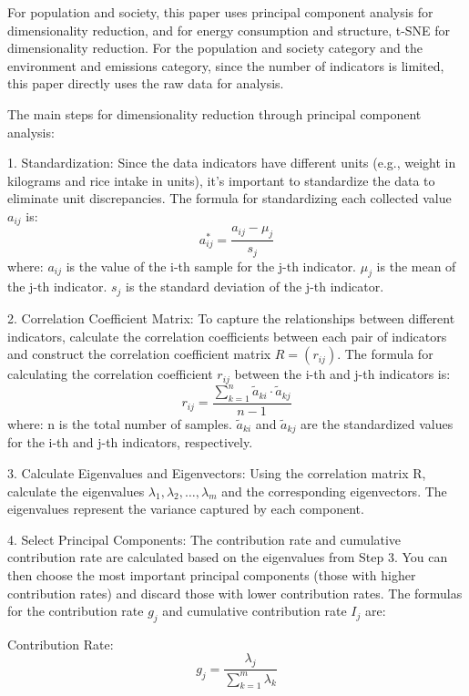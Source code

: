 \documentclass{article}
\begin{document}
	For population and society, this paper uses principal component analysis for dimensionality reduction, and for energy consumption and structure, t-SNE for dimensionality reduction. For the population and society category and the environment and emissions category, since the number of indicators is limited, this paper directly uses the raw data for analysis.
	
	The main steps for dimensionality reduction through principal component analysis:
	
	1. Standardization: Since the data indicators have different units (e.g., weight in kilograms and rice intake in units), it's important to standardize the data to eliminate unit discrepancies. The formula for standardizing each collected value $a_{ij}$ is:
	\begin{equation}
		a_{ij}^* = \frac{a_{ij} - \mu_j}{s_j}
	\end{equation}
	where: $a_{ij}$ is the value of the i-th sample for the j-th indicator. $\mu_{j}$ is the mean of the j-th indicator. $s_{j}$ is the standard deviation of the j-th indicator.
	
	2. Correlation Coefficient Matrix: To capture the relationships between different indicators, calculate the correlation coefficients between each pair of indicators and construct the correlation coefficient matrix $R=(r_{ij})$. The formula for calculating the correlation coefficient $r_{ij}$ between the i-th and j-th indicators is:
	\begin{equation}
		r_{ij}=\frac{\sum_{k=1}^{n}\tilde{a}_{ki}\cdot\tilde{a}_{kj}}{n-1}
	\end{equation}
	where: n is the total number of samples. $\tilde{a}_{ki}$ and $\tilde{a}_{kj}$ are the standardized values for the i-th and j-th indicators, respectively.
	
	3. Calculate Eigenvalues and Eigenvectors: Using the correlation matrix R, calculate the eigenvalues $\lambda_{1},\lambda_{2},\dots,\lambda_{m}$ and the corresponding eigenvectors. The eigenvalues represent the variance captured by each component. 
	
	4. Select Principal Components: The contribution rate and cumulative contribution rate are calculated based on the eigenvalues from Step 3. You can then choose the most important principal components (those with higher contribution rates) and discard those with lower contribution rates. The formulas for the contribution rate $g_{j}$ and cumulative contribution rate $I_{j}$ are:
	
	Contribution Rate:
	\begin{equation}
		g_{j}=\frac{\lambda_{j}}{\sum_{k=1}^{m}\lambda_{k}}
	\end{equation}
	
\end{document}
